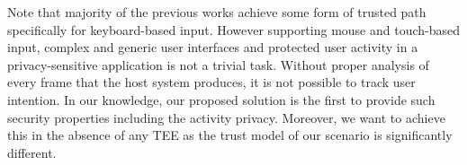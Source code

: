 Note that majority of the previous works achieve some form of trusted path specifically for keyboard-based input. However supporting mouse and touch-based input, complex and generic user interfaces and protected user activity in a privacy-sensitive application is not a trivial task. Without proper analysis of every frame that the host system produces, it is not possible to track user intention. In our knowledge, our proposed solution is the first to provide such security properties including the activity privacy. Moreover, we want to achieve this in the absence of any TEE as the trust model of our scenario is significantly different. 



